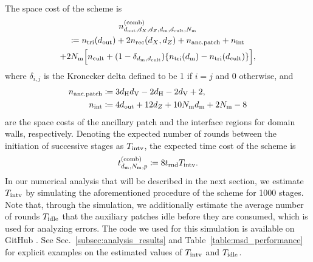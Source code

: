 \documentclass[
 prx,
 reprint,
 superscriptaddress,
 longbibliography,
 dvipsnames
]{revtex4-2}
\begin{document}
The space cost of the scheme is
\begin{multline}
    n^{(\mathrm{comb})}_{d_{\mathrm{out}}, {d_X}, {d_Z}, d_{\mathrm{m}}, d_\mathrm{cult}, N_{\mathrm{m}}} \\
    \coloneqq n_{\mathrm{tri}}\qty(d_{\mathrm{out}}) + 2n_{\mathrm{rec}}\qty({d_X},{d_Z}) + n_{\mathrm{anc.patch}} + n_{\mathrm{int}} \\
    + 2N_{\mathrm{m}}\Bigl[ n_{\mathrm{cult}} + \qty(1 - \delta_{d_{\mathrm{m}}, d_\mathrm{cult}})\qty{n_{\mathrm{tri}}\qty(d_{\mathrm{m}}) - n_{\mathrm{tri}}\qty(d_\mathrm{cult})}  \Bigr],
\label{eq:combined_space_cost}
\end{multline}
where $\delta_{i,j}$ is the Kronecker delta defined to be 1 if $i=j$ and 0 otherwise, and
\begin{align*}
    n_{\mathrm{anc.patch}} &\coloneqq 3d_{\mathrm{H}} d_{\mathrm{V}} - 2d_{\mathrm{H}} - 2d_{\mathrm{V}} + 2, \\
    n_{\mathrm{int}} &\coloneqq 4d_{\mathrm{out}} + 12{d_Z} + 10N_{\mathrm{m}}d_{\mathrm{m}} + 2N_{\mathrm{m}} - 8
\end{align*}
are the space costs of the ancillary patch and the interface regions for domain walls, respectively.
Denoting the expected number of rounds between the initiation of successive stages as $T_{\mathrm{intv}}$, the expected time cost of the scheme is
\begin{align}
    t^{(\mathrm{comb})}_{d_{\mathrm{m}}, N_{\mathrm{m}}, p} \coloneqq 8 t_{\mathrm{rnd}} T_{\mathrm{intv}}.
    \label{eq:combined_time_cost}
\end{align}
In our numerical analysis that will be described in the next section, we estimate $T_{\mathrm{intv}}$ by simulating the aforementioned procedure of the scheme for 1000 stages.
Note that, through the simulation, we additionally estimate the average number of rounds $T_{\mathrm{idle}}$ that the auxiliary patches idle before they are consumed, which is used for analyzing errors.
The code we used for this simulation is available on GitHub \cite{github:msd-magic-state-prep-cycle-simulation}.
See Sec.~\ref{subsec:analysis_results} and Table~\ref{table:msd_performance} for explicit examples on the estimated values of $T_{\mathrm{intv}}$ and $T_{\mathrm{idle}}$.
 
\end{document}
